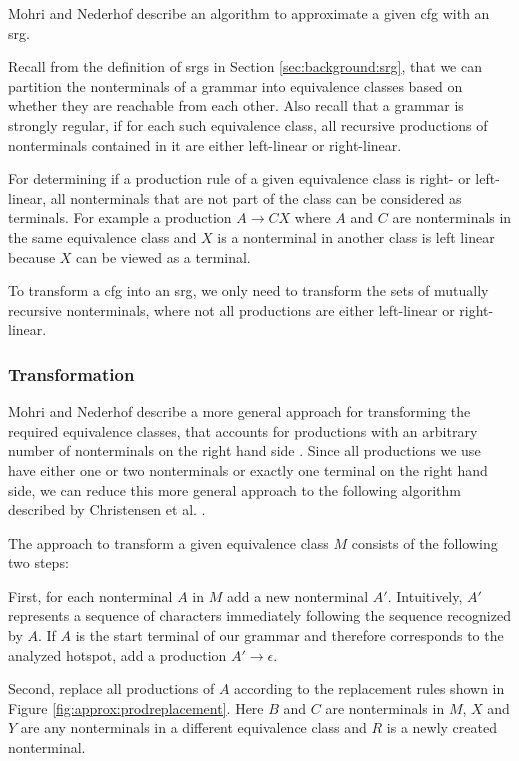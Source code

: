 Mohri and Nederhof \cite{mohri_nederhof} describe an algorithm to approximate a given \ac{cfg} with an \ac{srg}.

Recall from the definition of \acp{srg} in Section \ref{sec:background:srg}, that we can partition the nonterminals of a grammar into equivalence classes based on whether they are reachable from each other. Also recall that a grammar is strongly regular, if for each such equivalence class, all recursive productions of nonterminals contained in it are either left-linear or right-linear.

For determining if a production rule of a given equivalence class is right- or left-linear, all nonterminals that are not part of the class can be considered as terminals. For example a production $A \rightarrow CX$ where $A$ and $C$ are nonterminals in the same equivalence class and $X$ is a nonterminal in another class is left linear because $X$ can be viewed as a terminal.

To transform a \ac{cfg} into an \ac{srg}, we only need to transform the sets of mutually recursive nonterminals, where not all productions are either left-linear or right-linear.

\subsubsection{Transformation}

Mohri and Nederhof describe a more general approach for transforming the required equivalence classes, that accounts for productions with an arbitrary number of nonterminals on the right hand side \cite{mohri_nederhof}. Since all productions we use have either one or two nonterminals or exactly one terminal on the right hand side, we can reduce this more general approach to the following algorithm described by Christensen et al. \cite{brics}.

The approach to transform a given equivalence class $M$ consists of the following two steps:

First, for each nonterminal $A$ in $M$ add a new nonterminal $A'$. Intuitively, $A'$ represents a sequence of characters immediately following the sequence recognized by $A$. If $A$ is the start terminal of our grammar and therefore corresponds to the analyzed hotspot, add a production $A' \rightarrow \epsilon$.

Second, replace all productions of $A$ according to the replacement rules shown in Figure \ref{fig:approx:prodreplacement}. Here $B$ and $C$ are nonterminals in $M$, $X$ and $Y$ are any nonterminals in a different equivalence class and $R$ is a newly created nonterminal.

